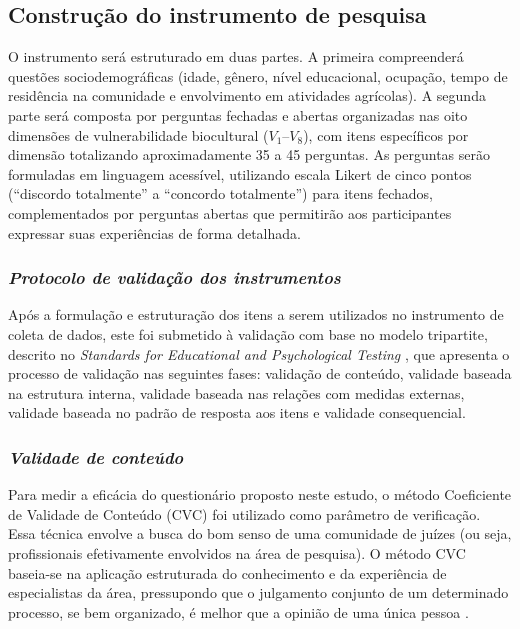\subsection{Construção do instrumento de pesquisa}

O instrumento será estruturado em duas partes. A primeira compreenderá questões sociodemográficas (idade, gênero, nível educacional, ocupação, tempo de residência na comunidade e envolvimento em atividades agrícolas). A segunda parte será composta por perguntas fechadas e abertas organizadas nas oito dimensões de vulnerabilidade biocultural ($V_1$--$V_8$), com itens específicos por dimensão totalizando aproximadamente 35 a 45 perguntas. As perguntas serão formuladas em linguagem acessível, utilizando escala Likert de cinco pontos (``discordo totalmente'' a ``concordo totalmente'') para itens fechados, complementados por perguntas abertas que permitirão aos participantes expressar suas experiências de forma detalhada.

\subsubsection{\textit{Protocolo de validação dos instrumentos}}

Após a formulação e estruturação dos itens a serem utilizados no instrumento de coleta de dados, este foi submetido à validação com base no modelo tripartite, descrito no \textit{Standards for Educational and Psychological Testing} \cite{Association2018}, que apresenta o processo de validação nas seguintes fases: validação de conteúdo, validade baseada na estrutura interna, validade baseada nas relações com medidas externas, validade baseada no padrão de resposta aos itens e validade consequencial.

\subsubsection{\textit{Validade de conteúdo}}

Para medir a eficácia do questionário proposto neste estudo, o método Coeficiente de Validade de Conteúdo (CVC) foi utilizado como parâmetro de verificação. Essa técnica envolve a busca do bom senso de uma comunidade de juízes (ou seja, profissionais efetivamente envolvidos na área de pesquisa). O método CVC baseia-se na aplicação estruturada do conhecimento e da experiência de especialistas da área, pressupondo que o julgamento conjunto de um determinado processo, se bem organizado, é melhor que a opinião de uma única pessoa \cite{Santos2018,Gurgel2021}.

